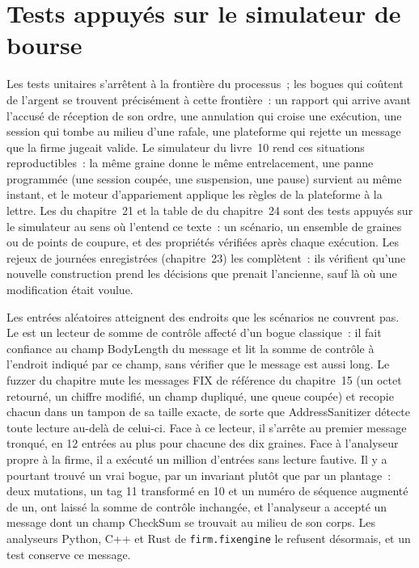 \section{Tests appuyés sur le simulateur de bourse}

Les tests unitaires s'arrêtent à la frontière du processus~; les bogues qui coûtent de l'argent se trouvent précisément à cette frontière~: un rapport qui arrive avant l'accusé de réception
de son ordre, une annulation qui croise une exécution, une session qui tombe au milieu d'une rafale, une plateforme qui rejette un message que la
firme jugeait valide. Le simulateur du livre~10 rend ces situations reproductibles~: la même graine donne le même entrelacement, une panne programmée
(une session coupée, une suspension, une pause) survient au même instant, et le moteur d'appariement applique les règles de la plateforme à la lettre.
Les  du chapitre~21 et la table de  du chapitre~24 sont des tests appuyés sur le simulateur au sens où l'entend ce texte~: un scénario, un ensemble de
graines ou de points de coupure, et des propriétés vérifiées après chaque exécution. Les rejeux de journées enregistrées (chapitre~23) les complètent~: ils vérifient
qu'une nouvelle construction prend les décisions que prenait l'ancienne, sauf là où une modification était voulue.

Les entrées aléatoires atteignent des endroits que les scénarios ne couvrent pas. Le  est un lecteur de somme de
contrôle affecté d'un bogue classique~: il fait confiance au champ BodyLength du message et lit la somme de contrôle à l'endroit indiqué par ce champ, sans
vérifier que le message est aussi long. Le fuzzer du chapitre mute les messages FIX de référence du chapitre~15 (un octet retourné,
un chiffre modifié, un champ dupliqué, une queue coupée) et recopie chacun dans un tampon de sa taille exacte, de sorte que
AddressSanitizer détecte toute lecture au-delà de celui-ci. Face à ce lecteur, il s'arrête au premier message tronqué, en 12 entrées au plus pour
chacune des dix graines. Face à l'analyseur propre à la firme, il a exécuté un million d'entrées sans lecture fautive. Il y a pourtant trouvé un vrai bogue,
par un invariant plutôt que par un plantage~: deux mutations, un tag 11 transformé en 10 et un numéro de séquence augmenté de un, ont laissé la
somme de contrôle inchangée, et l'analyseur a accepté un message dont un champ CheckSum se trouvait au milieu de son corps. Les analyseurs Python, C++ et Rust
de \texttt{firm.fixengine} le refusent désormais, et un test conserve ce message.

